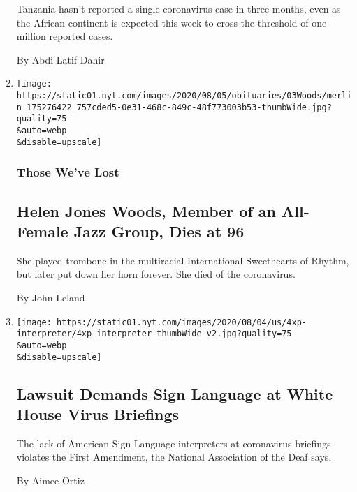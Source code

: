 \begin{enumerate}
  Tanzania hasn't reported a single coronavirus case in three months,
  even as the African continent is expected this week to cross the
  threshold of one million reported cases.

  By Abdi Latif Dahir
\item
  \href{/2020/08/04/obituaries/Helen-Woods-dead-coronavirus.html}{}

  \texttt{[image: https://static01.nyt.com/images/2020/08/05/obituaries/03Woods/merlin\_175276422\_757cded5-0e31-468c-849c-48f773003b53-thumbWide.jpg?quality=75\\\&auto=webp\\\&disable=upscale]}

  \hypertarget{those-weve-lost}{%
  \subsubsection{Those We've Lost}\label{those-weve-lost}}

  \hypertarget{helen-jones-woods-member-of-an-all-female-jazz-group-dies-at-96}{%
  \subsection{Helen Jones Woods, Member of an All-Female Jazz Group,
  Dies at
  96}\label{helen-jones-woods-member-of-an-all-female-jazz-group-dies-at-96}}

  She played trombone in the multiracial International Sweethearts of
  Rhythm, but later put down her horn forever. She died of the
  coronavirus.

  By John Leland
\item
  \href{/2020/08/04/us/politics/asl-interpreter-lawsuit-coronavirus-trump.html}{}

  \texttt{[image: https://static01.nyt.com/images/2020/08/04/us/4xp-interpreter/4xp-interpreter-thumbWide-v2.jpg?quality=75\\\&auto=webp\\\&disable=upscale]}

  \hypertarget{lawsuit-demands-sign-language-at-white-house-virus-briefings}{%
  \subsection{Lawsuit Demands Sign Language at White House Virus
  Briefings}\label{lawsuit-demands-sign-language-at-white-house-virus-briefings}}

  The lack of American Sign Language interpreters at coronavirus
  briefings violates the First Amendment, the National Association of
  the Deaf says.

  By Aimee Ortiz
\end{enumerate}

